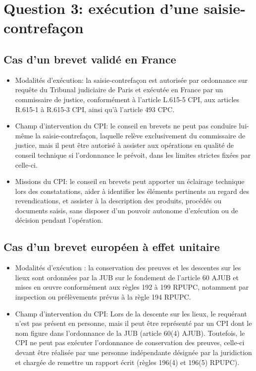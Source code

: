\section{Question 3: exécution d'une saisie-contrefaçon}

\subsection{Cas d'un brevet validé en France}

\begin{itemize}
  \item Modalités d’exécution: la saisie-contrefaçon est autorisée par ordonnance sur requête du Tribunal judiciaire de Paris et exécutée en France par un commissaire de justice, conformément à l’article L.615-5 CPI, aux articles R.615-1 à R.615-3 CPI, ainsi qu’à l’article 493 CPC.
  
  \item Champ d’intervention du CPI: le conseil en brevets ne peut pas conduire lui-même la saisie-contrefaçon, laquelle relève exclusivement du commissaire de justice, mais il peut être autorisé à assister aux opérations en qualité de conseil technique si l’ordonnance le prévoit, dans les limites strictes fixées par celle-ci.
  
  \item Missions du CPI: le conseil en brevets peut apporter un éclairage technique lors des constatations, aider à identifier les éléments pertinents au regard des revendications, et assister à la description des produits, procédés ou documents saisis, sans disposer d’un pouvoir autonome d’exécution ou de décision pendant l’opération.
\end{itemize}


\subsection{Cas d'un brevet européen à effet unitaire}

\begin{itemize}
  \item Modalités d’exécution : la conservation des preuves et les descentes sur les lieux sont ordonnées par la JUB sur le fondement de l’article 60 AJUB et mises en œuvre conformément aux règles 192 à 199 RPUPC, notamment par inspection ou prélèvements prévus à la règle 194 RPUPC.
  
  \item Champ d'intervention du CPI: Lors de la descente sur les lieux, le requérant n'est pas présent en personne, mais il 
  peut être représenté par un CPI dont le nom figure dans l'ordonnance de la JUB (article 60(4) AJUB). Toutefois, le CPI ne peut pas exécuter
l’ordonnance de conservation des preuves, celle-ci devant être réalisée par une personne
indépendante désignée par la juridiction et chargée de remettre un rapport écrit (règles 196(4) et
196(5) RPUPC).
\end{itemize}

